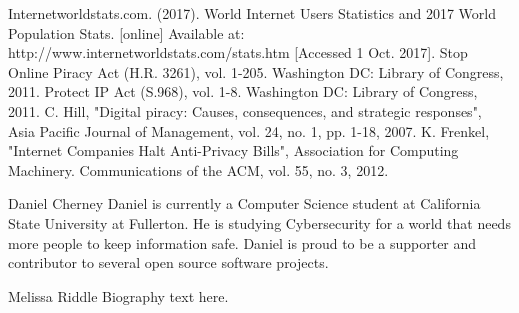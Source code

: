 \documentclass[11pt,journal,compsoc]{IEEEtran}
\begin{document}

%
%
%

\begin{thebibliography}{1}

Internetworldstats.com. (2017). World Internet Users Statistics and 2017 World Population Stats. [online] Available at: 				http://www.internetworldstats.com/stats.htm [Accessed 1 Oct. 2017].
Stop Online Piracy Act (H.R. 3261), vol. 1-205. Washington DC: Library of Congress, 2011.
Protect IP Act (S.968), vol. 1-8. Washington DC: Library of Congress, 2011.
C. Hill, "Digital piracy: Causes, consequences, and strategic responses", Asia Pacific Journal of Management, vol. 24, no. 1, pp. 1-18, 2007.
K. Frenkel, "Internet Companies Halt Anti-Privacy Bills", Association for Computing Machinery. Communications of the ACM, vol. 55, no. 3, 2012.

\end{thebibliography}

% 

\begin{IEEEbiographynophoto}{Daniel Cherney}
Daniel is currently a Computer Science student at California State University at Fullerton. He is studying Cybersecurity for a world that needs more people to keep information safe. Daniel is proud to be a supporter and contributor to several open source software projects. 
\end{IEEEbiographynophoto}

\begin{IEEEbiographynophoto}{Melissa Riddle}
Biography text here.
\end{IEEEbiographynophoto}
\end{document}
